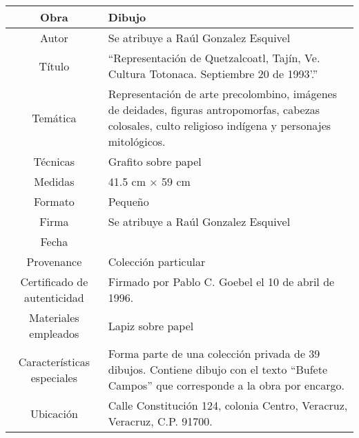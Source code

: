 \documentclass[10pt,letter]{report}
\begin{document}
\begin{table}[H]
\centering
\begin{tabular}{|c|m{}|}
\hline
Obra& Dibujo	\\
\hline
Autor & Se atribuye a Ra\'ul Gonzalez Esquivel\\
\hline
T\'itulo & ``Representaci\'on de Quetzalcoatl, Taj\'in, Ve. Cultura Totonaca. Septiembre 20 de 1993'.'' \\
\hline
Tem\'atica & Representaci\'on de arte precolombino, im\'agenes de deidades, figuras antropomorfas, cabezas colosales, culto religioso ind\'igena y personajes mitol\'ogicos.\\
\hline
T\'ecnicas &Grafito sobre papel \\
\hline
Medidas & 41.5 cm $\times$ 59 cm \\
\hline
 Formato & Peque\~no \\
 \hline
 Firma & Se atribuye a Ra\'ul Gonzalez Esquivel  \\
 \hline
 Fecha & \\
 \hline
 Provenance & Colecci\'on particular\\
 \hline
 Certificado de autenticidad& Firmado por Pablo C. Goebel el 10 de abril de 1996.  \\
 \hline 
  Materiales empleados & Lapiz sobre papel\\
 \hline
 Caracter\'isticas especiales & Forma parte de una colecci\'on privada de 39 dibujos. 
Contiene dibujo con el texto ``Bufete Campos'' que corresponde a la obra por encargo. \\
\hline 
Ubicaci\'on & Calle Constituci\'on 124, colonia Centro, Veracruz, Veracruz, C.P. 91700.\\
\hline

\end{tabular}
\end{table}
\end{document}
